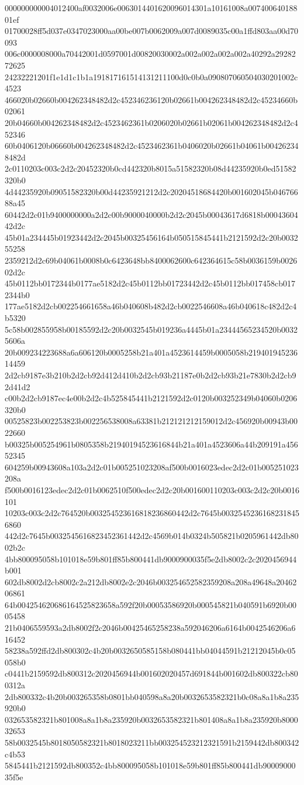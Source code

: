 000000000004012400af0032006e0063014401620096014301a10161008a00740064018801ef
01700028ff5d037e0347023000aa00be007b0062009a007d0089035c00a1ffd803aa00d70093
006c0000008000a70442001d0597001d00820030002a002a002a002a002a40292a2928272625
24232221201f1e1d1c1b1a191817161514131211100d0c0b0a090807060504030201002c4523
466020b02660b004262348482d2c452346236120b02661b004262348482d2c45234660b02061
20b04660b004262348482d2c4523462361b0206020b02661b02061b004262348482d2c452346
60b0406120b06660b004262348482d2c4523462361b0406020b02661b04061b004262348482d
2c0110203c003c2d2c20452320b0cd442320b8015a51582320b08d44235920b0ed51582320b0
4d44235920b09051582320b00d44235921212d2c20204518684420b001602045b04676688a45
60442d2c01b9400000000a2d2c00b9000040000b2d2c2045b00043617d6818b0004360442d2c
45b01a234445b01923442d2c2045b00325456164b050515845441b2121592d2c20b003255258
2359212d2c69b04061b0008b0c6423648bb8400062600c642364615c58b0036159b002602d2c
45b0112bb0172344b0177ae5182d2c45b0112bb01723442d2c45b0112bb017458cb0172344b0
177ae5182d2cb002254661658a46b040608b482d2cb0022546608a46b040618c482d2c4b5320
5c58b002855958b00185592d2c20b0032545b019236a4445b01a23444565234520b00325606a
20b009234223688a6a606120b0005258b21a401a4523614459b0005058b21940194523614459
2d2cb9187e3b210b2d2cb92d412d410b2d2cb93b21187e0b2d2cb93b21e7830b2d2cb92d41d2
c00b2d2cb9187ec4e00b2d2c4b525845441b2121592d2c0120b003252349b04060b0206320b0
00525823b002253823b002256538008a63381b212121212159012d2c456920b00943b0022660
b00325b005254961b0805358b21940194523616844b21a401a4523606a44b209191a45652345
604259b00943608a103a2d2c01b005251023208af500b0016023edec2d2c01b005251023208a
f500b0016123edec2d2c01b0062510f500edec2d2c20b001600110203c003c2d2c20b0016101
10203c003c2d2c764520b003254523616818236860442d2c7645b00325452361682318456860
442d2c7645b0032545616823452361442d2c4569b014b0324b505821b0205961442db8002b2c
4bb800095058b101018e59b801ff85b800441db9000900035f5e2db8002c2c2020456944b001
602db8002d2cb8002c2a212db8002e2c2046b003254652582359208a208a49648a2046206861
64b004254620686164525823658a592f20b00053586920b000545821b040591b6920b0005458
21b0406559593a2db8002f2c2046b00425465258238a592046206a6164b0042546206a616452
58238a592ffd2db800302c4b20b0032650585158b080441bb04044591b21212045b0c05058b0
c0441b2159592db800312c2020456944b001602020457d691844b001602db800322cb800312a
2db800332c4b20b003265358b0801bb040598a8a20b0032653582321b0c08a8a1b8a235920b0
032653582321b801008a8a1b8a235920b0032653582321b801408a8a1b8a235920b800032653
58b0032545b8018050582321b8018023211bb003254523212321591b2159442db800342c4b53
5845441b2121592db800352c4bb800095058b101018e59b801ff85b800441db9000900035f5e
